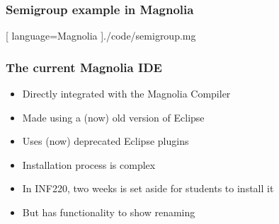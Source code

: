 \begin{frame}
  \frametitle{Semigroup example in Magnolia}
  \begin{center}
    
    [ language=Magnolia
    ]{./code/semigroup.mg}
  \end{center}
\end{frame}

\begin{frame}
  \frametitle{The current Magnolia IDE}
  \pause
  \begin{itemize}
    \item Directly integrated with the Magnolia Compiler
      \pause
    \item Made using a (now) old version of Eclipse
      \pause
    \item Uses (now) deprecated Eclipse plugins
      \pause
    \item Installation process is complex
      \pause
    \item In INF220, two weeks is set aside for students to install it
      \pause
    \item But has functionality to show renaming
  \end{itemize}
\end{frame}

%
%
